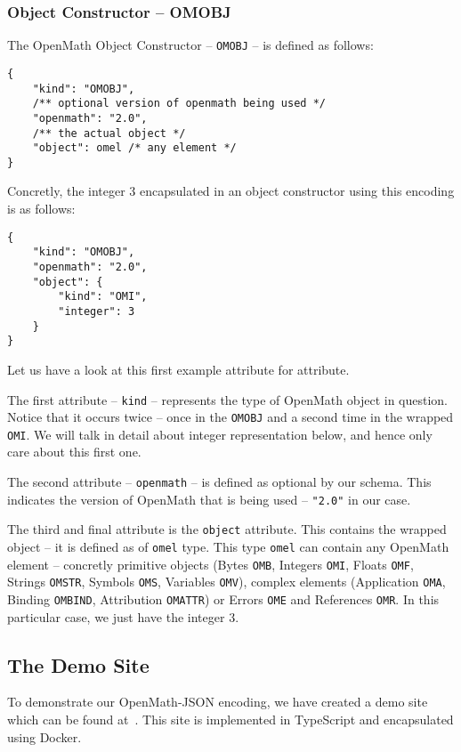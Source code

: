 \subsubsection{Object Constructor -- OMOBJ}

The OpenMath Object Constructor -- \texttt{OMOBJ} -- is defined as follows:
\begin{lstlisting}
{
    "kind": "OMOBJ",
    /** optional version of openmath being used */
    "openmath": "2.0",
    /** the actual object */
    "object": omel /* any element */
}
\end{lstlisting}
Concretly, the integer 3 encapsulated in an object constructor using this encoding is as follows:
\begin{lstlisting}
{
    "kind": "OMOBJ",
    "openmath": "2.0",
    "object": {
        "kind": "OMI", 
        "integer": 3
    }
}
\end{lstlisting}

Let us have a look at this first example attribute for attribute. 

The first attribute -- \texttt{kind} -- represents the type of OpenMath object in question. 
Notice that it occurs twice -- once in the \texttt{OMOBJ} and a second time in the wrapped \texttt{OMI}. 
We will talk in detail about integer representation below, and hence only care about this first one. 

The second attribute -- \texttt{openmath} -- is defined as optional by our schema. 
This indicates the version of OpenMath that is being used -- \lstinline{"2.0"} in our case. 

The third and final attribute is the \texttt{object} attribute. 
This contains the wrapped object -- it is defined as of \texttt{omel} type. 
This type \texttt{omel} can contain any OpenMath element -- concretly
primitive objects (Bytes \texttt{OMB}, Integers \texttt{OMI}, Floats \texttt{OMF}, Strings \texttt{OMSTR}, Symbols \texttt{OMS}, Variables \texttt{OMV}), 
complex elements (Application \texttt{OMA}, Binding \texttt{OMBIND}, Attribution \texttt{OMATTR}) or
Errors \texttt{OME} and References \texttt{OMR}. 
In this particular case, we just have the integer $3$. 

\subsection{The Demo Site}

To demonstrate our OpenMath-JSON encoding, we have created a demo site which can be found at~\cite{openmathjson:web}. 
This site is implemented in TypeScript and encapsulated using Docker\cite{docker:webpage}. 

